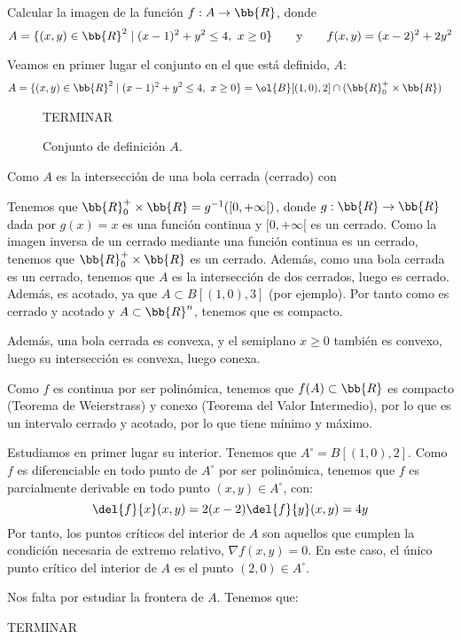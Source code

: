 \begin{ejercicio}
    Calcular la imagen de la función $f: A \to \bb{R}$, donde
    \begin{equation*}
        A = \{(x,y)\in \bb{R}^2\mid (x-1)^2+y^2\leq 4,~x\geq 0\}
        \qquad \text{y} \qquad
        f(x,y)=(x-2)^2+2y^2
    \end{equation*}

    Veamos en primer lugar el conjunto en el que está definido, $A$:
    \begin{equation*}
        \begin{split}
            A &= \{(x,y)\in \bb{R}^2\mid (x-1)^2+y^2\leq 4,~x\geq 0\}
            = \ol{B}[(1,0),2]\cap (\bb{R}^+_0\times \bb{R})
        \end{split}
    \end{equation*}
    \begin{figure}[H]
        \centering
        TERMINAR
        \caption{Conjunto de definición $A$.}
    \end{figure}

    Como $A$ es la intersección de una bola cerrada (cerrado) con 
    
    Tenemos que $\bb{R}^+_0\times \bb{R}=g^{-1}([0,+\infty[)$, donde $g:\bb{R}\to \bb{R}$ dada por $g(x)=x$ es una función continua y $[0,+\infty[$ es un cerrado. Como la imagen inversa de un cerrado mediante una función continua es un cerrado, tenemos que $\bb{R}^+_0\times \bb{R}$ es un cerrado. Además, como una bola cerrada es un cerrado, tenemos que $A$ es la intersección de dos cerrados, luego es cerrado. Además, es acotado, ya que $A\subset B[(1,0), 3]$ (por ejemplo). Por tanto como es cerrado y acotado y $A\subset \bb{R}^n$, tenemos que es compacto. 

    Además, una bola cerrada es convexa, y el semiplano $x\geq 0$ también es convexo, luego su intersección es convexa, luego conexa. 
    
    Como $f$ es continua por ser polinómica, tenemos que $f(A)\subset \bb{R}$ es compacto (Teorema de Weierstrass) y conexo (Teorema del Valor Intermedio), por lo que es un intervalo cerrado y acotado, por lo que tiene mínimo y máximo.

    Estudiamos en primer lugar su interior. Tenemos que $A^\circ = B[(1,0),2]$. Como $f$ es diferenciable en todo punto de $A^\circ$ por ser polinómica, tenemos que $f$ es parcialmente derivable en todo punto $(x,y)\in A^\circ$, con:
    \begin{equation*}
        \del{f}{x}(x,y) = 2(x-2) \\
        \del{f}{y}(x,y) = 4y
    \end{equation*}
    Por tanto, los puntos críticos del interior de $A$ son aquellos que cumplen la condición necesaria de extremo relativo, $\nabla f(x,y)=0$. En este caso, el único punto crítico del interior de $A$ es el punto $(2,0)\in A^\circ$.

    Nos falta por estudiar la frontera de $A$. Tenemos que:

    TERMINAR
\end{ejercicio}


